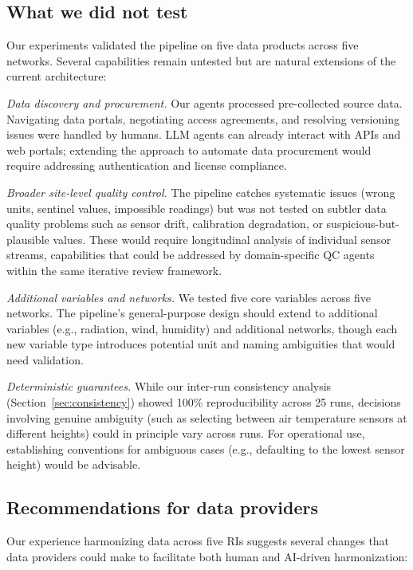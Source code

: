 \documentclass[review,authoryear]{elsarticle}
\begin{document}
\subsection{What we did not test}
\label{sec:not-tested}

Our experiments validated the pipeline on five data products across five networks. Several capabilities remain untested but are natural extensions of the current architecture:

\textit{Data discovery and procurement.} Our agents processed pre-collected source data. Navigating data portals, negotiating access agreements, and resolving versioning issues were handled by humans. LLM agents can already interact with APIs and web portals; extending the approach to automate data procurement would require addressing authentication and license compliance.

\textit{Broader site-level quality control.} The pipeline catches systematic issues (wrong units, sentinel values, impossible readings) but was not tested on subtler data quality problems such as sensor drift, calibration degradation, or suspicious-but-plausible values. These would require longitudinal analysis of individual sensor streams, capabilities that could be addressed by domain-specific QC agents within the same iterative review framework.

\textit{Additional variables and networks.} We tested five core variables across five networks. The pipeline's general-purpose design should extend to additional variables (e.g., radiation, wind, humidity) and additional networks, though each new variable type introduces potential unit and naming ambiguities that would need validation.

\textit{Deterministic guarantees.} While our inter-run consistency analysis (Section~\ref{sec:consistency}) showed 100\% reproducibility across 25 runs, decisions involving genuine ambiguity (such as selecting between air temperature sensors at different heights) could in principle vary across runs. For operational use, establishing conventions for ambiguous cases (e.g., defaulting to the lowest sensor height) would be advisable.

\subsection{Recommendations for data providers}
\label{sec:ri-recommendations}

Our experience harmonizing data across five RIs suggests several changes that data providers could make to facilitate both human and AI-driven harmonization:
\end{document}
